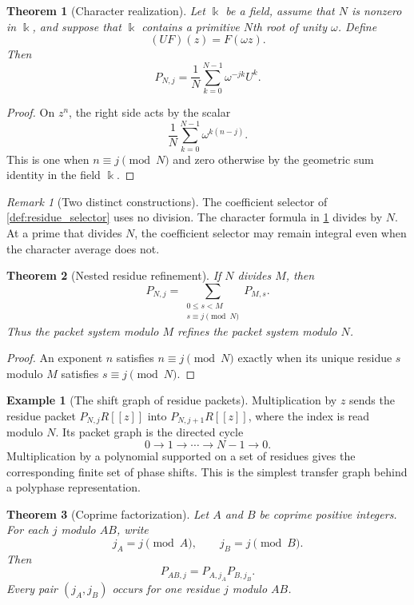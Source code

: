 \documentclass{aomart}
\newtheorem{theorem}{Theorem}[section]
\theoremstyle{definition}
\newtheorem{example}[example]{Example}
\theoremstyle{remark}
\newtheorem{remark}[remark]{Remark}
\newcommand{\bbk}{\Bbbk}
\begin{document}
\begin{theorem}[Character realization]\label{thm:character_realization}
Let $\bbk$ be a field, assume that $N$ is nonzero in $\bbk$, and suppose that $\bbk$ contains a primitive $N$th root of unity $\omega$.  Define
\[
(UF)(z)=F(\omega z).
\]
Then
\[
P_{N,j}
=
\frac1N\sum_{k=0}^{N-1}\omega^{-jk}U^k.
\]
\end{theorem}

\begin{proof}
On $z^n$, the right side acts by the scalar
\[
\frac1N\sum_{k=0}^{N-1}\omega^{k(n-j)}.
\]
This is one when $n\equiv j\pmod N$ and zero otherwise by the geometric sum identity in the field $\bbk$.
\end{proof}

\begin{remark}[Two distinct constructions]\label{rem:selector_character}
The coefficient selector of \cref{def:residue_selector} uses no division.  The character formula in \cref{thm:character_realization} divides by $N$.  At a prime that divides $N$, the coefficient selector may remain integral even when the character average does not.
\end{remark}

\begin{theorem}[Nested residue refinement]\label{thm:residue_refinement}
If $N$ divides $M$, then
\[
P_{N,j}
=
\sum_{\substack{0\leq s<M\\s\equiv j\pmod N}}P_{M,s}.
\]
Thus the packet system modulo $M$ refines the packet system modulo $N$.
\end{theorem}

\begin{proof}
An exponent $n$ satisfies $n\equiv j\pmod N$ exactly when its unique residue $s$ modulo $M$ satisfies $s\equiv j\pmod N$.
\end{proof}

\begin{example}[The shift graph of residue packets]\label{ex:residue_shift}
Multiplication by $z$ sends the residue packet $P_{N,j}R[[z]]$ into $P_{N,j+1}R[[z]]$, where the index is read modulo $N$.  Its packet graph is the directed cycle
\[
0\longrightarrow1\longrightarrow\cdots\longrightarrow N-1\longrightarrow0.
\]
Multiplication by a polynomial supported on a set of residues gives the corresponding finite set of phase shifts.  This is the simplest transfer graph behind a polyphase representation.
\end{example}

\begin{theorem}[Coprime factorization]\label{thm:crt_factorization}
Let $A$ and $B$ be coprime positive integers.  For each $j$ modulo $AB$, write
\[
j_A=j\pmod A,
\qquad
j_B=j\pmod B.
\]
Then
\[
P_{AB,j}=P_{A,j_A}P_{B,j_B}.
\]
Every pair $(j_A,j_B)$ occurs for one residue $j$ modulo $AB$.
\end{theorem}
\end{document}
